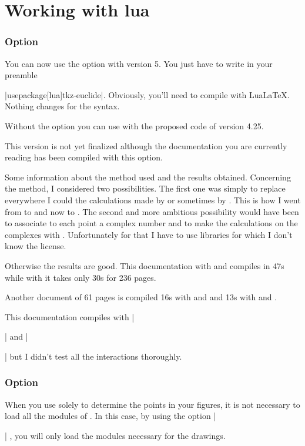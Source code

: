 \newpage
\section{Working with lua} \label{calc_with_lua}

\subsubsection{Option } %
\label{ssub:option_code_lua}

You can now use the  option with \tkzname{\tkznameofpack} version 5.
You just have to write in your preamble

 |usepackage[lua]{tkz-euclide}|. 
 Obviously, you'll need to compile with LuaLaTeX. Nothing changes for the syntax.

Without the option you can use \tkzname{\tkznameofpack} with the proposed code of version 4.25.

This version is not yet finalized although the documentation you are currently reading has been compiled with this option.

Some information about the method used and the results obtained. Concerning the method, I considered two possibilities. The first one was simply to replace everywhere I could the calculations made by  or sometimes by . This is how I went from  to  and now to . The second and more ambitious possibility would have been to associate to each point a complex number and to make the calculations on the complexes with . Unfortunately for that I have to use libraries for which I don't know the license. 

Otherwise the results are good. This documentation with  and  compiles in 47s while with  it takes only 30s for 236 pages.

Another document of 61 pages is compiled 16s with  and  and 13s with   and .

This documentation compiles with |\usepackage{tkz-base}|  and |\usepackage[lua]{tkz-euclide}| but I didn't test all the interactions thoroughly. 

\subsubsection{Option } %
\label{ssub:option_code_mini}

When you use  solely to determine the points in your figures, it is not necessary to load all the modules of \tkzname{\tkznameofpack}. In this case, by using the  option |\usepackage[mini]{tkz-euclide}| , you will only load the modules necessary for the drawings.

\endinput